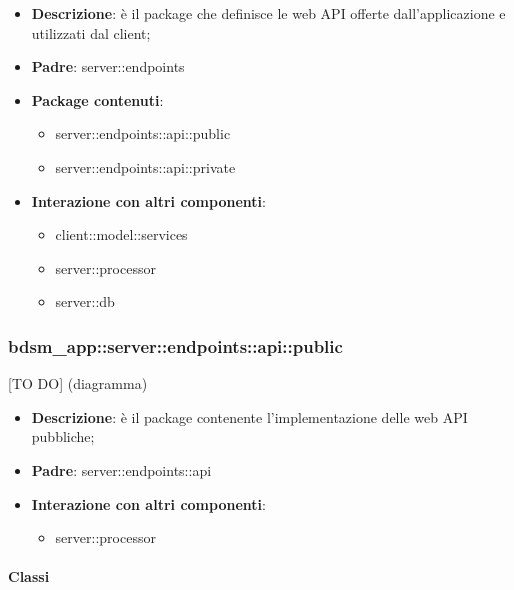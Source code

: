 \begin{itemize}
  \item \textbf{Descrizione}: è il package che definisce le web API offerte dall'applicazione e utilizzati dal client;
  \item \textbf{Padre}: server::endpoints
  \item \textbf{Package contenuti}:
  	\begin{itemize}
  		\item server::endpoints::api::public
  		\item server::endpoints::api::private
	\end{itemize}
  \item \textbf{Interazione con altri componenti}:
  	\begin{itemize}
  		\item client::model::services
  		\item server::processor
  		\item server::db
	\end{itemize}
\end{itemize}

\subsubsection{bdsm\_app::server::endpoints::api::public} %
\label{ssub:bdsm_app_server_endpoints_api_public}
[TO DO] (diagramma) \newline \newline

\begin{itemize}
  \item \textbf{Descrizione}: è il package contenente l'implementazione delle web API pubbliche;
  \item \textbf{Padre}: server::endpoints::api
  \item \textbf{Interazione con altri componenti}:
  	\begin{itemize}
        \item server::processor
    \end{itemize}
\end{itemize}

	\paragraph{Classi} %

